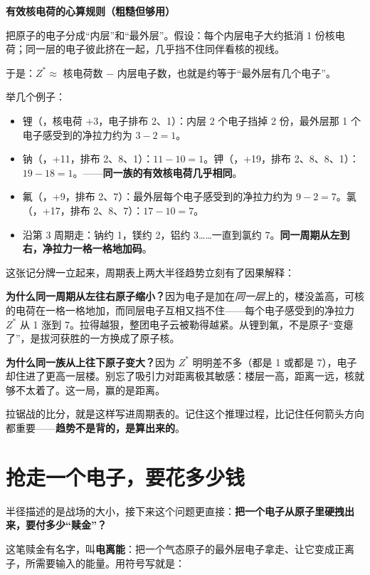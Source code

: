 \begin{qiaoliang}
\textbf{有效核电荷的心算规则（粗糙但够用）}

把原子的电子分成“内层”和“最外层”。假设：每个内层电子大约抵消 1 份核电荷；同一层的电子彼此挤在一起，几乎挡不住同伴看核的视线。

于是：$Z^{*} \approx$ 核电荷数 $-$ 内层电子数，也就是约等于“最外层有几个电子”。

举几个例子：
\begin{itemize}[itemsep=1pt]
\item 锂（，核电荷 +3，电子排布 2、1）：内层 2 个电子挡掉 2 份，最外层那 1 个电子感受到的净拉力约为 $3-2=1$。
\item 钠（，+11，排布 2、8、1）：$11-10=1$。钾（，+19，排布 2、8、8、1）：$19-18=1$。——\textbf{同一族的有效核电荷几乎相同}。
\item 氟（，+9，排布 2、7）：最外层每个电子感受到的净拉力约为 $9-2=7$。氯（，+17，排布 2、8、7）：$17-10=7$。
\item 沿第 3 周期走：钠约 1，镁约 2，铝约 3……一直到氯约 7。\textbf{同一周期从左到右，净拉力一格一格地加码}。
\end{itemize}
\end{qiaoliang}

这张记分牌一立起来，周期表上两大半径趋势立刻有了因果解释：

\textbf{为什么同一周期从左往右原子缩小？}因为电子是加在\emph{同一层}上的，楼没盖高，可核的电荷在一格一格地加，而同层电子互相又挡不住——每个电子感受到的净拉力 $Z^{*}$ 从 1 涨到 7。拉得越狠，整团电子云被勒得越紧。从锂到氟，不是原子“变瘪了”，是拔河获胜的一方换成了原子核。

\textbf{为什么同一族从上往下原子变大？}因为 $Z^{*}$ 明明差不多（都是 1 或都是 7），电子却住进了更高一层楼。别忘了吸引力对距离极其敏感：楼层一高，距离一远，核就够不太着了。这一局，赢的是距离。

拉锯战的比分，就是这样写进周期表的。记住这个推理过程，比记住任何箭头方向都重要——\textbf{趋势不是背的，是算出来的}。

\section{抢走一个电子，要花多少钱}

半径描述的是战场的大小，接下来这个问题更直接：\textbf{把一个电子从原子里硬拽出来，要付多少“赎金”？}

这笔赎金有名字，叫\textbf{电离能}：把一个气态原子的最外层电子拿走、让它变成正离子，所需要输入的能量。用符号写就是：

